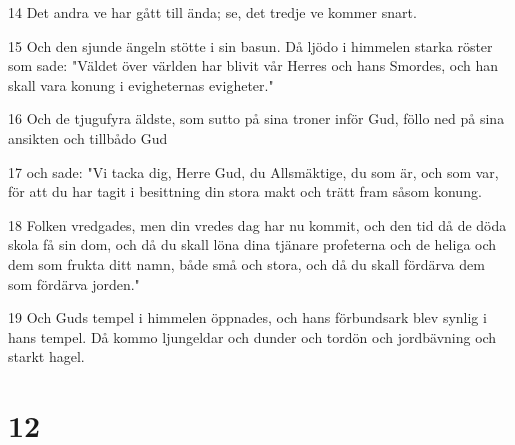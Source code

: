 \par 14 Det andra ve har gått till ända; se, det tredje ve kommer snart.
\par 15 Och den sjunde ängeln stötte i sin basun. Då ljödo i himmelen starka röster som sade: "Väldet över världen har blivit vår Herres och hans Smordes, och han skall vara konung i evigheternas evigheter."
\par 16 Och de tjugufyra äldste, som sutto på sina troner inför Gud, föllo ned på sina ansikten och tillbådo Gud
\par 17 och sade: "Vi tacka dig, Herre Gud, du Allsmäktige, du som är, och som var, för att du har tagit i besittning din stora makt och trätt fram såsom konung.
\par 18 Folken vredgades, men din vredes dag har nu kommit, och den tid då de döda skola få sin dom, och då du skall löna dina tjänare profeterna och de heliga och dem som frukta ditt namn, både små och stora, och då du skall fördärva dem som fördärva jorden."
\par 19 Och Guds tempel i himmelen öppnades, och hans förbundsark blev synlig i hans tempel. Då kommo ljungeldar och dunder och tordön och jordbävning och starkt hagel.

\chapter{12}

